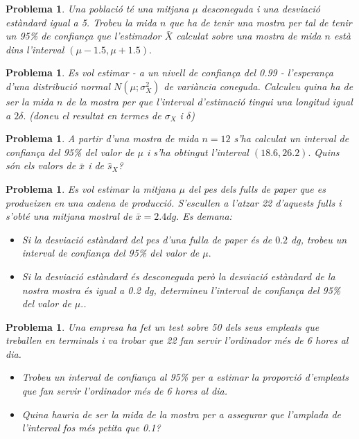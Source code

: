 \documentclass[11pt]{article}
\newcounter{prbcont}
\newtheorem{problema}[prbcont]{Problema}
\begin{document}
\begin{problema}
Una poblaci\'o t\'e una mitjana $\mu$ desconeguda i una desviaci\'o est\`andard igual a 5. Trobeu
la mida $n$ que ha de tenir una mostra per tal de tenir un 95\% de confian\c{c}a que
l'estimador $\bar{X}$ calculat sobre una mostra de mida $n$ est\`a dins l'interval $(\mu-1.5,\mu+1.5).$ %
\end{problema}

\begin{problema}
Es vol estimar - a un nivell de confian\c{c}a del 0.99 - l'esperan\c{c}a d'una distribuci\'o normal
$N(\mu; \sigma_X^2)$ de vari\`ancia coneguda. Calculeu quina ha de ser la mida $n$ de la mostra per
que l'interval d'estimaci\'o tingui una longitud igual a $2\delta.$ (doneu el resultat en termes de $\sigma_X$ i $\delta$)%
\end{problema}

\begin{problema}
A partir d'una mostra de mida $n = 12$ s'ha calculat un interval de confian\c{c}a del 95\%
del valor de $\mu$ i s'ha obtingut l'interval $(18.6,26.2).$ Quins s\'on els valors de $\bar{x}$ i de $\hat{s}_X$? %
\end{problema}

\begin{problema}
Es vol estimar la mitjana $\mu$ del pes dels fulls de paper que es produeixen en una cadena
de producci\'o. S'escullen a l'atzar 22 d'aquests fulls i s'obt\'e una mitjana mostral de
$\bar{x} = 2.4 dg.$ Es demana:
\begin{itemize}
\item [(a)] Si la desviaci\'o est\`andard del pes d'una fulla de paper \'es de $0.2$ dg, trobeu un
interval de confian\c{c}a del 95\% del valor de $\mu.$ %
\item [(b)] Si la desviaci\'o est\`andard \'es desconeguda per\`o la desviaci\'o est\`andard 
de la nostra mostra \'es igual a 0.2 dg, determineu l'interval de confian\c{c}a del 95\%
del valor de $\mu.$. %
\end{itemize}
\end{problema}

\begin{problema}
Una empresa ha fet un test sobre 50 dels seus empleats que treballen en terminals i va
trobar que 22 fan servir l'ordinador m\'es de 6 hores al dia.
\begin{itemize}
\item [(a)] Trobeu un interval de confian\c{c}a al 95\% per a estimar la proporci\'o d'empleats que
fan servir l'ordinador m\'es de 6 hores al dia.
\item [(b)] Quina hauria de ser la mida de la mostra per a assegurar que l'amplada de l'interval fos m\'es petita que 0.1?
\end{itemize}
\end{problema}
\end{document}
